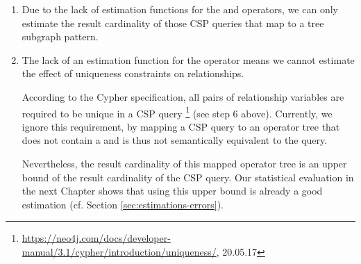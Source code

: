 \begin{enumerate}
  \item Due to the lack of estimation functions for the  and 
    operators, we can only estimate
    the result cardinality of those CSP queries that map to a
    tree subgraph pattern.
  \item The lack of an estimation function for the  operator
    means we cannot estimate the effect of uniqueness constraints on relationships.
    
    According to the Cypher specification, all pairs of relationship variables
    are required to be unique in a CSP query%
    \footnote{\url{https://neo4j.com/docs/developer-manual/3.1/cypher/introduction/uniqueness/},
    20.05.17} (see step 6 above).
    Currently, we ignore this requirement, by mapping a
    CSP query to an operator tree that does not
    contain a  and is thus not semantically equivalent
    to the query.
    
    Nevertheless, the result cardinality of this mapped operator tree is
    an upper bound of the result cardinality of the CSP query.
    Our statistical evaluation in the next Chapter shows that using this upper
    bound is already a good estimation (cf. Section \ref{sec:estimations-errors}).
\end{enumerate}
